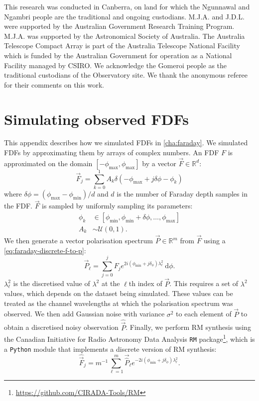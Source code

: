 This research was conducted in Canberra, on land for which the Ngunnawal and Ngambri people are the traditional and ongoing custodians. M.J.A. and J.D.L. were supported by the Australian Government Research Training Program. M.J.A. was supported by the Astronomical Society of Australia. The Australia Telescope Compact Array is part of the Australia Telescope National Facility which is funded by the Australian Government for operation as a National Facility managed by CSIRO. We acknowledge the Gomeroi people as the traditional custodians of the Observatory site. We thank the anonymous referee for their comments on this work.


\appendix

\section{Simulating observed FDFs}
\label{sec:faraday-simulating}

  This appendix describes how we simulated FDFs in \autoref{cha:faraday}. We simulated FDFs by approximating them by arrays of complex numbers. An FDF $F$ is approximated on the domain $[-\phi_{\max}, \phi_{\max}]$ by a vector $\vec F \in \mathbb R^d$:
    \begin{equation}
      \label{eq:faraday-vec-f}
      \vec F_j = \sum_{k = 0}^1 A_k \delta(-\phi_{\max} + j \delta \phi - \phi_k)
    \end{equation}
    where $\delta\phi = (\phi_{\max} - \phi_{\min}) / d$ and $d$ is the number of Faraday depth samples in the FDF.
    $\vec F$ is sampled by uniformly sampling its parameters:
    \begin{align}
      \label{eq:faraday-model-distributions}
      \phi_k &\in [\phi_{\min}, \phi_{\min} + \delta\phi, \dots, \phi_{\max}]\\
      A_k &\sim \mathcal U(0, 1).
    \end{align}
    We then generate a vector polarisation spectrum $\vec P \in \mathbb R^m$ from $\vec F$ using a \autoref{eq:faraday-discrete-f-to-p}:
    \begin{equation}
      \label{eq:faraday-discrete-f-to-p}
      \vec P_\ell = \sum_{j = 0}^{j} F_j e^{2i(\phi_{\min} + j\delta_\phi)\lambda^2_\ell}\ \mathrm{d}\phi.
    \end{equation}
    $\lambda^2_\ell$ is the discretised value of $\lambda^2$ at the $\ell$th index of $\vec P$. This requires a set of $\lambda^2$ values, which depends on the dataset being simulated. These values can be treated as the channel wavelengths at which the polarisation spectrum was observed. We then add Gaussian noise with variance $\sigma^2$ to each element of $\vec P$ to obtain a discretised noisy observation $\hat{\vec{P}}$. Finally, we perform RM synthesis using the Canadian Initiative for Radio Astronomy Data Analysis \texttt{RM} package\footnote{\url{https://github.com/CIRADA-Tools/RM}}, which is a \texttt{Python} module that implements a discrete version of RM synthesis:
    \begin{equation}
      \label{eq:faraday-discrete-rm-synthesis}
      \hat{\vec{F}}_j = m^{-1} \sum_{\ell = 1}^m \vec{\hat P}_\ell e^{-2i(\phi_{\min} + j\delta_\phi)\lambda^2_\ell}.
    \end{equation}

